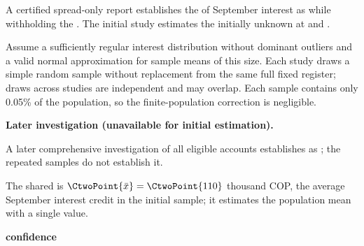 \begin{probleminfoexcerpt}
A certified spread-only report establishes the    of September interest as    while withholding the  . The initial study estimates the initially unknown   at  and  .
\end{probleminfoexcerpt}

\begin{probleminfoexcerpt}
Assume a sufficiently regular interest distribution without dominant outliers and a valid normal approximation for sample means of this size. Each study draws a simple random sample without replacement from the same full fixed register; draws across studies are independent and may overlap. Each sample contains only 0.05\% of the population, so the finite-population correction is negligible.
\end{probleminfoexcerpt}

\textbf{Later investigation (unavailable for initial estimation).}

\begin{probleminfoexcerpt}
A later comprehensive investigation of all eligible accounts establishes    as   ; the repeated samples do not establish it.
\end{probleminfoexcerpt}

The shared  is $\CtwoPoint{\bar x}=\CtwoPoint{110}$ thousand COP, the average September interest credit in the initial sample; it estimates the population mean with a single value.

\textbf{ confidence}

